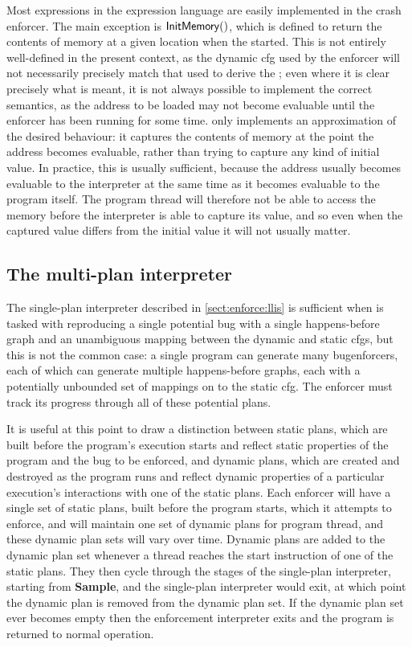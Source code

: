 Most expressions in the {\StateMachine} expression language are easily
implemented in the crash enforcer.  The main exception is $\mathsf{InitMemory}()$,
which is defined to return the contents of memory at a given location
when the {\StateMachine} started.  This is not entirely well-defined
in the present context, as the dynamic \gls{cfg} used by the enforcer
will not necessarily precisely match that used to derive the
{\StateMachine}; even where it is clear precisely what is meant, it is
not always possible to implement the correct semantics, as the address
to be loaded may not become evaluable until the enforcer has been
running for some time.  {\Implementation} only implements an
approximation of the desired behaviour: it captures the contents of
memory at the point the address becomes evaluable, rather than trying
to capture any kind of initial value.  In practice, this is usually
sufficient, because the address usually becomes evaluable to the
interpreter at the same time as it becomes evaluable to the program
itself.  The program thread will therefore not be able to access the
memory before the interpreter is able to capture its value, and so
even when the captured value differs from the initial value it will
not usually matter.

\subsection{The multi-plan interpreter}
\label{sect:enforce:succ}

The single-plan interpreter described in \autoref{sect:enforce:llis}
is sufficient when {\technique} is tasked with reproducing a single
potential bug with a single happens-before graph and an unambiguous
mapping between the dynamic and static \glspl{cfg}, but this is not
the common case: a single program can generate many
\glspl{bugenforcer}, each of which can generate multiple
happens-before graphs, each with a potentially unbounded set of
mappings on to the static \gls{cfg}.  The enforcer must track its
progress through all of these potential plans.

 It is useful at this point to draw a distinction between
static plans, which are built before the program's execution starts
and reflect static properties of the program and the bug to be
enforced, and dynamic plans, which are created and destroyed as the
program runs and reflect dynamic properties of a particular
execution's interactions with one of the static plans.  Each enforcer
will have a single set of static plans, built before the program
starts, which it attempts to enforce, and will maintain one set of
dynamic plans for program thread, and these dynamic plan sets will
vary over time.  Dynamic plans are added to the dynamic plan set
whenever a thread reaches the start instruction of one of the static
plans.  They then cycle through the stages of the single-plan
interpreter, starting from \textbf{Sample}, and the single-plan
interpreter would exit, at which point the dynamic plan is removed
from the dynamic plan set.  If the dynamic plan set ever becomes empty
then the enforcement interpreter exits and the program is returned to
normal operation.

